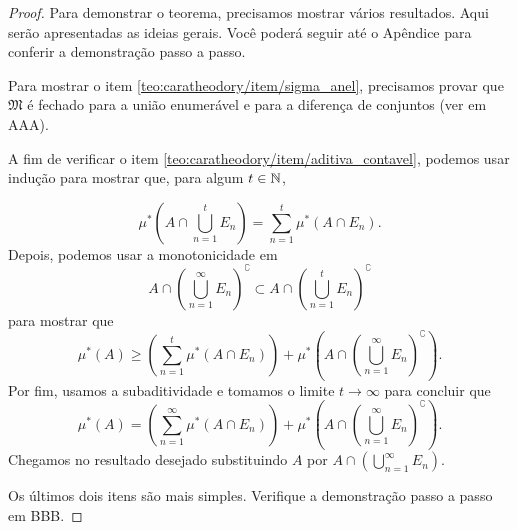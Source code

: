 \begin{proof}
    Para demonstrar o teorema, precisamos mostrar vários resultados. Aqui serão apresentadas as ideias gerais. Você poderá seguir até o Apêndice para conferir a demonstração passo a passo.
    
    Para mostrar o item \ref{teo:caratheodory/item/sigma_anel}, precisamos provar que $\mathfrak{M}$ é fechado para a união enumerável e para a diferença de conjuntos (ver em AAA).
    
    A fim de verificar o item \ref{teo:caratheodory/item/aditiva_contavel}, podemos usar indução para mostrar que, para algum $t\in\mathbb{N}$,
    
    \begin{equation*}
        \mu^{*}\left(A\cap \bigcup_{n=1}^{t} E_n \right) = \sum_{n=1}^{t} \mu^{*}\left(A\cap E_n\right).
    \end{equation*}
    Depois, podemos usar a monotonicidade em 
    \begin{equation*}
        A\cap\left(\bigcup_{n=1}^{\infty} E_n\right)^{\complement}\subset A\cap\left(\bigcup_{n=1}^{t} E_n\right)^{\complement}
    \end{equation*}
    para mostrar que 
    \begin{equation*}
        \mu^{*}(A)\geq\left(\sum_{n=1}^{t}\mu^{*}(A\cap E_n)\right) + \mu^{*}\left(A\cap\left(\bigcup_{n=1}^{\infty} E_n\right)^{\complement}\right).
    \end{equation*}
    Por fim, usamos a subaditividade e tomamos o limite $t\rightarrow \infty$ para concluir que
    \begin{equation*}
        \mu^{*}(A) =\left(\sum_{n=1}^{\infty}\mu^{*}(A\cap E_n)\right) + \mu^{*}\left(A\cap\left(\bigcup_{n=1}^{\infty} E_n\right)^{\complement}\right).
    \end{equation*}
    Chegamos no resultado desejado substituindo $A$ por $A\cap\left(\bigcup_{n=1}^{\infty} E_n\right)$.
    
    Os últimos dois itens são mais simples. Verifique a demonstração passo a passo em BBB.
    \end{proof}